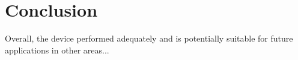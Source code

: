 \section{Conclusion}
\label{Conclusion}

Overall, the device performed adequately and is potentially suitable for future applications in other areas...


